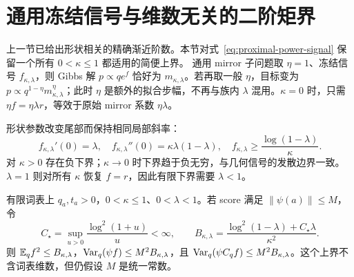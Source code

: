 










\section{通用冻结信号与维数无关的二阶矩界}

上一节已给出形状相关的精确渐近阶数。本节对式~\eqref{eq:proximal-power-signal} 保留一个所有 $0<\kappa\le1$ 都适用的简便上界。
通用 mirror 子问题取 $\eta=1$、冻结信号 $f_{\kappa,\lambda}$，则 Gibbs 解 $p\propto qe^f$ 恰好为 $m_{\kappa,\lambda}$。若再取一般 $\eta$，目标变为 $p\propto q^{1-\eta}m_{\kappa,\lambda}^\eta$；此时 $\eta$ 是额外的拟合步幅，不再与族内 $\lambda$ 混用。$\kappa=0$ 时，只需 $\eta f=\eta\lambda r$，等效于原始 mirror 系数 $\eta\lambda$。

形状参数改变尾部而保持相同局部斜率：
\begin{equation}
 f_{\kappa,\lambda}'(0)=\lambda,\quad
 f_{\kappa,\lambda}''(0)=\kappa\lambda(1-\lambda),\quad
 f_{\kappa,\lambda}\ge\frac{\log(1-\lambda)}\kappa.
\end{equation}
对 $\kappa>0$ 存在负下界；$\kappa\to0$ 时下界趋于负无穷，与几何信号的发散边界一致。$\lambda=1$ 则对所有 $\kappa$ 恢复 $f=r$，因此有限下界需要 $\lambda<1$。

\begin{theorem}[幂均值信号的统一二阶矩界]
\label{thm:proximal-power-variance}
有限词表上 $q_a,t_a>0$，$0<\kappa\le1$、$0<\lambda<1$。若 score 满足 $\|\psi(a)\|\le M$，令
\begin{equation}
 C_\star=\sup_{u>0}\frac{\log^2(1+u)}u<\infty,
 \qquad B_{\kappa,\lambda}
 =\frac{\log^2(1-\lambda)+C_\star\lambda}{\kappa^2}.
\end{equation}
则 $\mathbb E_qf^2\le B_{\kappa,\lambda}$，$\operatorname{Var}_q(\psi f)\le M^2B_{\kappa,\lambda}$，且 $\operatorname{Var}_q(\psi C_qf)\le M^2B_{\kappa,\lambda}$。这个上界不含词表维数，但仍假设 $M$ 是统一常数。
\end{theorem}

